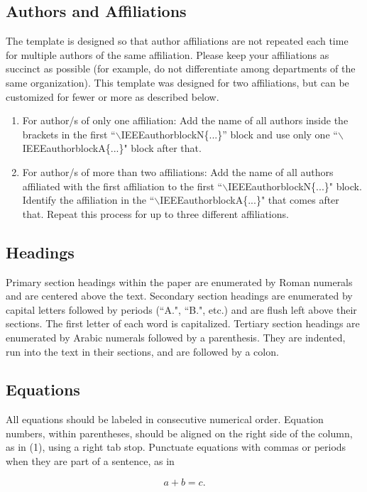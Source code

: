 \documentclass[conference, 10pt]{IEEEtran}
\begin{document}
\subsection{Authors and Affiliations}
The template is designed so that author affiliations are not repeated each time for multiple authors of the same affiliation. Please keep your affiliations as succinct as possible (for example, do not differentiate among departments of the same organization). This template was designed for two affiliations, but can be customized for fewer or more as described below.

\begin{enumerate}
\item For author/s of only one affiliation: Add the name of all authors inside the brackets in the first ``$\backslash$IEEEauthorblockN\{...\}'' block and use only one ``$\backslash$IEEEauthorblockA\{...\}" block after that.
\item For author/s of more than two affiliations: Add the name of all authors affiliated with the first affiliation to the first ``$\backslash$IEEEauthorblockN\{...\}" block. Identify the affiliation in the  ``$\backslash$IEEEauthorblockA\{...\}" that comes after that. Repeat this process for up to three different affiliations.
\end{enumerate}

\subsection{Headings}
Primary section headings within the paper are enumerated by Roman numerals and are centered above the text.  Secondary section headings are enumerated by capital letters followed by periods (``A.", ``B.", etc.) and are flush left above their sections. The first letter of each word is capitalized. Tertiary section headings are enumerated by Arabic numerals followed by a parenthesis. They are indented, run into the text in their sections, and are followed by a colon.

\subsection{Equations}
All equations should be labeled in consecutive numerical order. Equation numbers, within parentheses, should be aligned on the right side of the column, as in (1), using a right tab stop. Punctuate equations with commas or periods when they are part of a sentence, as in

\begin{equation}
a+b=c.
\end{equation}
\end{document}
